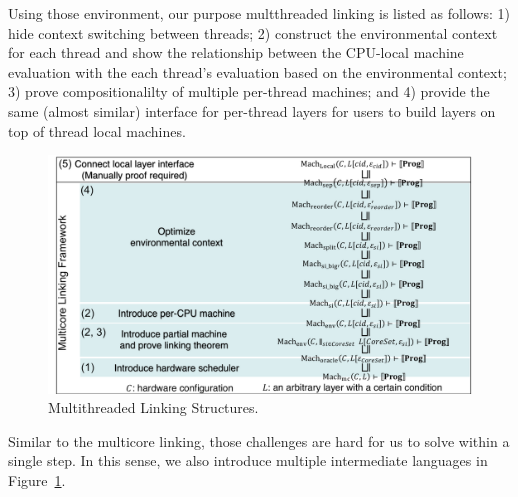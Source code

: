 Using those environment, 
our purpose multthreaded linking is listed as follows:
1) hide context switching between threads; 
2) construct the environmental context for each thread and show the relationship between the 
CPU-local machine evaluation with the each thread's evaluation based on the environmental context;
3) prove compositionalilty of multiple per-thread machines; and 
4) provide the same (almost similar) interface for per-thread layers 
for users to build layers on top of thread local machines. 
\begin{figure}
\begin{center}
\includegraphics[width=\textwidth, page=2]{figs/conlink/concurrent_linking}
\caption{Multithreaded Linking Structures.}
\label{fig:chapter:linking:multithreaded-linking-structure}
\end{center}
\end{figure}
Similar to the multicore linking, 
those challenges are hard for us to solve within a single step. 
In this sense, 
we also introduce multiple intermediate languages
in Figure~\ref{fig:chapter:linking:multithreaded-linking-structure}. 



